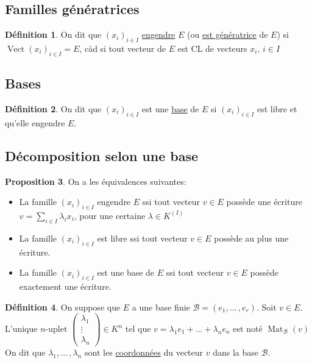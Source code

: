 \documentclass[10pt,a4paper]{article}
\theoremstyle{definition}
\newtheorem{proposition}{Proposition}[section]
\newtheorem{definition}[proposition]{Définition}
\DeclareMathOperator{\vect}{Vect}
\DeclareMathOperator{\mat}{Mat}
\begin{document}
\subsection{Familles génératrices}
\begin{definition}
On dit que $(x_i)_{i \in I}$ \uline{engendre} $E$ (ou \uline{est génératrice} de $E$) si $\vect(x_i)_{i \in I} = E$, càd si tout vecteur de $E$ est CL de vecteurs $x_i,\, i \in I$
\end{definition}

\subsection{Bases}
\begin{definition}
On dit que $(x_i)_{i \in I}$ est une \uline{base} de $E$ si $(x_i)_{i \in I}$ est libre et qu'elle engendre $E$.
\end{definition}

\subsection{Décomposition selon une base}
\begin{proposition}
On a les équivalences suivantes:
\begin{itemize}
\item La famille $(x_i)_{i \in I}$ engendre $E$ ssi tout vecteur $v \in E$ possède une écriture \\
$v = \sum\limits_{i \in I} \lambda_i x_i$, pour une certaine $\lambda \in K^{(I)}$
\item La famille $(x_i)_{i \in I}$ est libre ssi tout vecteur $v \in E$ possède au plus une écriture.
\item La famille $(x_i)_{i \in I}$ est une base de $E$ ssi tout vecteur $v \in E$ possède exactement une écriture.
\end{itemize}
\end{proposition}
\begin{definition}
On suppose que $E$ a une base finie $\mathcal{B} = (e_1, ...\, , e_r)$. Soit $v \in E$. \\
L'unique $n$-uplet $\begin{pmatrix}
\lambda_1 \\
\vdots \\
\lambda_n
\end{pmatrix} \in K^n$ tel que $v = \lambda_1 e_1 + ... + \lambda_n e_n$ est noté $\mat_\mathcal{B}(v)$ \\
On dit que $\lambda_1, ...\, , \lambda_n$ sont les \uline{coordonnées} du vecteur $v$ dans la base $\mathcal{B}$.
\end{definition}
\end{document}

